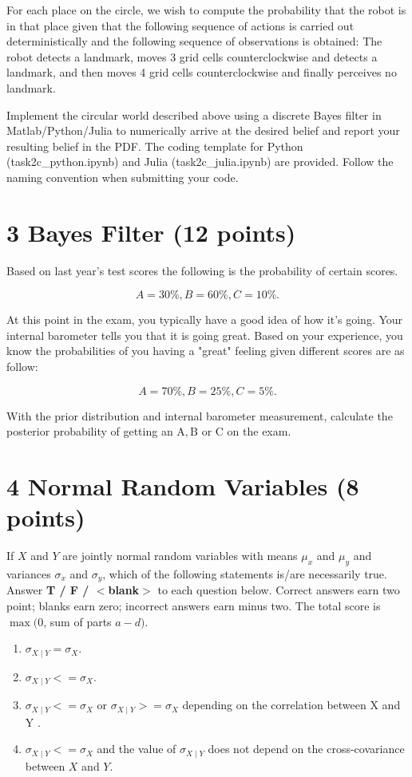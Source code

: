 \documentclass{article}
\theoremstyle{definition}
\begin{document}
\begin{enumerate}[label=\Alph*.]
For each place on the circle, we wish to compute the probability that the robot is in that place given that the following sequence of actions is carried out deterministically and the following sequence of observations is obtained: The robot detects a landmark, moves 3 grid cells counterclockwise and detects a landmark, and then moves 4 grid cells counterclockwise and finally perceives no landmark.

Implement the circular world described above using a discrete Bayes filter in Matlab/Python/Julia to numerically arrive at the desired belief and report your resulting belief in the PDF. The coding template for Python (task2c\_python.ipynb) and Julia (task2c\_julia.ipynb) are provided. Follow the naming convention when submitting your code.

\end{enumerate}

\section*{3 Bayes Filter (12 points)}
Based on last year's test scores the following is the probability of certain scores.

$$
A=30 \%,  B=60 \%, C=10 \% .
$$

At this point in the exam, you typically have a good idea of how it's going. Your internal barometer tells you that it is going great. Based on your experience, you know the probabilities of you having a "great" feeling given different scores are as follow:

$$
A=70 \%, B=25 \%, C=5 \% .
$$

With the prior distribution and internal barometer measurement, calculate the posterior probability of getting an $\mathrm{A}, \mathrm{B}$ or C on the exam.

\section*{4 Normal Random Variables (8 points)}
If $X$ and $Y$ are jointly normal random variables with means $\mu_{x}$ and $\mu_{y}$ and variances $\sigma_{x}$ and $\sigma_{y}$, which of the following statements is/are necessarily true.\\
Answer \textbf{T / F / $<$blank$>$} to each question below. Correct answers earn two point; blanks earn zero; incorrect answers earn minus two. The total score is $\max (0$, sum of parts $a-d)$.
\begin{enumerate}[label=(\alph*)]
    \item $ \sigma_{X \mid Y}=\sigma_{X}$.
    \item $\sigma_{X \mid Y}<=\sigma_{X}$.
    \item $\sigma_{X \mid Y}<=\sigma_{X}$ or $\sigma_{X \mid Y}>=\sigma_{X}$ depending on the correlation between X and Y .
    \item $\sigma_{X \mid Y}<=\sigma_{X}$ and the value of $\sigma_{X \mid Y}$ does not depend on the cross-covariance between $X$ and $Y$.
\end{enumerate}
\end{document}
